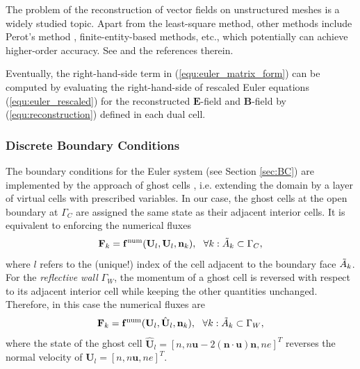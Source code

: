 \documentclass{article}
\begin{document}
The problem of the reconstruction of vector fields on unstructured meshes is a widely
studied topic. Apart from the least-square method, other methods include Perot's method
\citep{perot_2000}, finite-entity-based methods, etc., which potentially can achieve
higher-order accuracy. See \cite[][Sec. 3.4.4]{fuchs_2021} and the references therein.

Eventually, the right-hand-side term in (\ref{equ:euler_matrix_form}) can be computed by
evaluating the right-hand-side of rescaled Euler equations (\ref{equ:euler_rescaled}) for
the reconstructed $\mathbf{E}$-field and $\mathbf{B}$-field by (\ref{equ:reconstruction})
defined in each dual cell.

\subsubsection{Discrete Boundary Conditions}

The boundary conditions for the Euler system (see Section \ref{sec:BC}) are implemented by
the approach of ghost cells \cite[][Ch. 7]{leveque_2007}, i.e. extending the domain by a
layer of virtual cells with prescribed variables. In our case, the ghost cells at the open
boundary at $\Gamma_C$ are assigned the same state as their adjacent interior cells. It is
equivalent to enforcing the numerical fluxes
\begin{equation} \label{equ:discrete_open_bc}
    \mathbf{F}_k = {\mathbf{f}^\text{num}}(\mathbf{U}_l, \mathbf{U}_l, \mathbf{n}_k), \ \ \forall k: \Tilde{A}_k \subset \Gamma_C,
\end{equation}
where $l$ refers to the (unique!) index of the cell adjacent to the boundary face
$\Tilde{A}_k$. For the \emph{reflective wall} $\Gamma_W$, the momentum of a ghost cell is
reversed with respect to its adjacent interior cell while keeping the other quantities
unchanged. Therefore, in this case the numerical fluxes are
\begin{equation} \label{equ:discrete_wall_bc} \mathbf{F}_k =
  \mathbf{f}^\text{num}(\mathbf{U}_l, \hat{\mathbf{U}}_l, \mathbf{n}_k), \ \ \forall k:
  \Tilde{A}_k \subset \Gamma_W,
\end{equation}
where the state of the ghost cell
$\hat{\mathbf{U}}_l = [n, n\mathbf{u} - 2(\mathbf{n}\cdot\mathbf{u})\mathbf{n}, ne]^T$
reverses the normal velocity of $\mathbf{U}_l = [n, n\mathbf{u}, ne]^T$.
\end{document}
